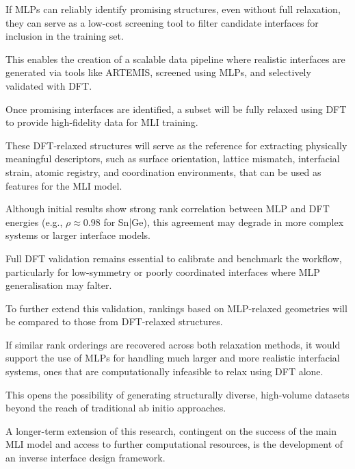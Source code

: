 If MLPs can reliably identify promising structures, even without full relaxation, they can serve as a low-cost screening
tool to filter candidate interfaces for inclusion in the training set\nocite{}.

This enables the creation of a scalable data pipeline where realistic interfaces are generated via tools like ARTEMIS,
screened using MLPs, and selectively validated with DFT\cite{Taylor2020-nl}.

\label{para:objectives_dft_validation} %

Once promising interfaces are identified, a subset will be fully relaxed using DFT to provide high-fidelity data for MLI
training\nocite{}.

These DFT-relaxed structures will serve as the reference for extracting physically meaningful descriptors, such as
surface orientation, lattice mismatch, interfacial strain, atomic registry, and coordination environments, that can be
used as features for the MLI model\cite{Gouveia2025-fpml}.

\label{para:objectives_dft_mlp_comparison} %

Although initial results show strong rank correlation between MLP and DFT energies (e.g., $\rho \approx 0.98$ for Sn|Ge), this
agreement may degrade in more complex systems or larger interface models.

Full DFT validation remains essential to calibrate and benchmark the workflow, particularly for low-symmetry or poorly
coordinated interfaces where MLP generalisation may falter.

\label{para:objectives_relaxation_scaling} %

To further extend this validation, rankings based on MLP-relaxed geometries will be compared to those from DFT-relaxed
structures\nocite{}.

If similar rank orderings are recovered across both relaxation methods, it would support the use of MLPs for handling
much larger and more realistic interfacial systems, ones that are computationally infeasible to relax using DFT alone\nocite{}.

This opens the possibility of generating structurally diverse, high-volume datasets beyond the reach of traditional ab
initio approaches\nocite{}.

\label{para:objectives_inverse_design} %

A longer-term extension of this research, contingent on the success of the main MLI model and access to further
computational resources, is the development of an inverse interface design framework\nocite{}.

